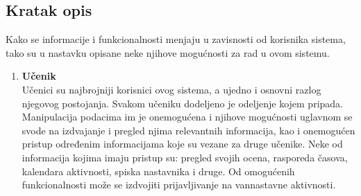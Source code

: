 \documentclass{article}
\begin{document}
\subsection{Kratak opis}
	Kako se informacije i funkcionalnosti menjaju u zavisnosti od korisnika sistema, tako su u nastavku opisane neke njihove
mogućnosti za rad u ovom sistemu.
	\begin{enumerate}
	\item \textbf{Učenik} \\
	Učenici su najbrojniji korisnici ovog sistema, a ujedno i osnovni razlog njegovog postojanja. Svakom učeniku dodeljeno je odeljenje kojem pripada. Manipulacija podacima im je onemogućena i njihove mogućnosti uglavnom se svode na izdvajanje i pregled njima relevantnih informacija, kao i onemogućen pristup određenim informacijama koje su vezane za druge učenike. Neke od informacija kojima imaju pristup su: 
pregled svojih ocena, rasporeda časova, kalendara aktivnosti, spiska nastavnika i druge. Od omogućenih funkcionalnosti može se izdvojiti prijavljivanje na vannastavne aktivnosti.
 

\end{enumerate}
\end{document}
